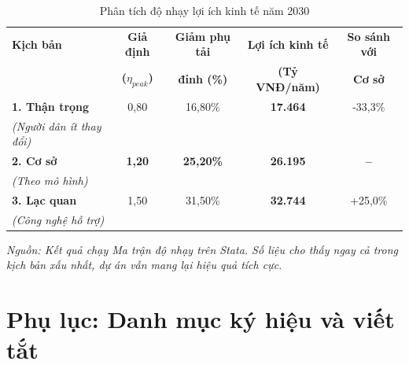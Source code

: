 \documentclass[12pt,a4paper,oneside]{article}
\begin{document}
\begin{table}[H]
	\centering
	\caption{Phân tích độ nhạy lợi ích kinh tế năm 2030}
	\label{tab:sensitivity}
	\begin{tabular}{l c c c c}
		\toprule
		\textbf{Kịch bản} & \textbf{Giả định} & \textbf{Giảm phụ tải} & \textbf{Lợi ích kinh tế} & \textbf{So sánh với} \\
		& \textbf{($\eta_{peak}$)} & \textbf{đỉnh (\%)} & \textbf{(Tỷ VNĐ/năm)} & \textbf{Cơ sở} \\
		\midrule
		\textbf{1. Thận trọng} & 0,80 & 16,80\% & \textbf{17.464} & -33,3\% \\
		\textit{(Người dân ít thay đổi)} & & & & \\
		\addlinespace
		\textbf{2. Cơ sở} & \textbf{1,20} & \textbf{25,20\%} & \textbf{26.195} & \textbf{--} \\
		\textit{(Theo mô hình)} & & & & \\
		\addlinespace
		\textbf{3. Lạc quan} & 1,50 & 31,50\% & \textbf{32.744} & +25,0\% \\
		\textit{(Công nghệ hỗ trợ)} & & & & \\
		\bottomrule
	\end{tabular}
	\footnotesize{\textit{Nguồn: Kết quả chạy Ma trận độ nhạy trên Stata. Số liệu cho thấy ngay cả trong kịch bản xấu nhất, dự án vẫn mang lại hiệu quả tích cực.}}
\end{table}


\section{Phụ lục: Danh mục ký hiệu và viết tắt}
\end{document}
